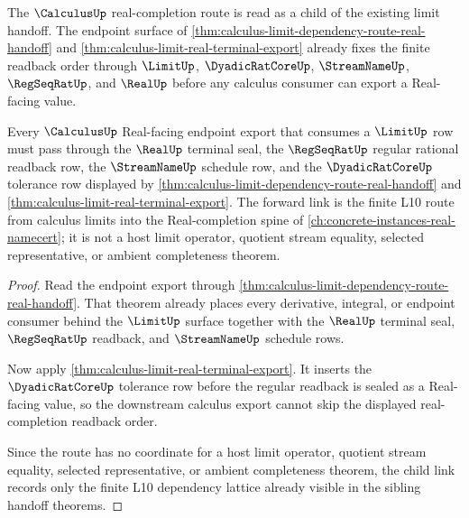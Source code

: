 The $\CalculusUp$ real-completion route is read as a child of the existing limit handoff. The endpoint surface of \autoref{thm:calculus-limit-dependency-route-real-handoff} and \autoref{thm:calculus-limit-real-terminal-export} already fixes the finite readback order through $\LimitUp$, $\DyadicRatCoreUp$, $\StreamNameUp$, $\RegSeqRatUp$, and $\RealUp$ before any calculus consumer can export a Real-facing value.

\begin{theorem}
\label{thm:calculus-real-completion-forward-link}
Every $\CalculusUp$ Real-facing endpoint export that consumes a $\LimitUp$ row must pass through the $\RealUp$ terminal seal, the $\RegSeqRatUp$ regular rational readback row, the $\StreamNameUp$ schedule row, and the $\DyadicRatCoreUp$ tolerance row displayed by \autoref{thm:calculus-limit-dependency-route-real-handoff} and \autoref{thm:calculus-limit-real-terminal-export}. The forward link is the finite L10 route from calculus limits into the Real-completion spine of \autoref{ch:concrete-instances-real-namecert}; it is not a host limit operator, quotient stream equality, selected representative, or ambient completeness theorem.
\end{theorem}
\begin{proof}
Read the endpoint export through \autoref{thm:calculus-limit-dependency-route-real-handoff}. That theorem already places every derivative, integral, or endpoint consumer behind the $\LimitUp$ surface together with the $\RealUp$ terminal seal, $\RegSeqRatUp$ readback, and $\StreamNameUp$ schedule rows.

Now apply \autoref{thm:calculus-limit-real-terminal-export}. It inserts the $\DyadicRatCoreUp$ tolerance row before the regular readback is sealed as a Real-facing value, so the downstream calculus export cannot skip the displayed real-completion readback order.

Since the route has no coordinate for a host limit operator, quotient stream equality, selected representative, or ambient completeness theorem, the child link records only the finite L10 dependency lattice already visible in the sibling handoff theorems.
\end{proof}
